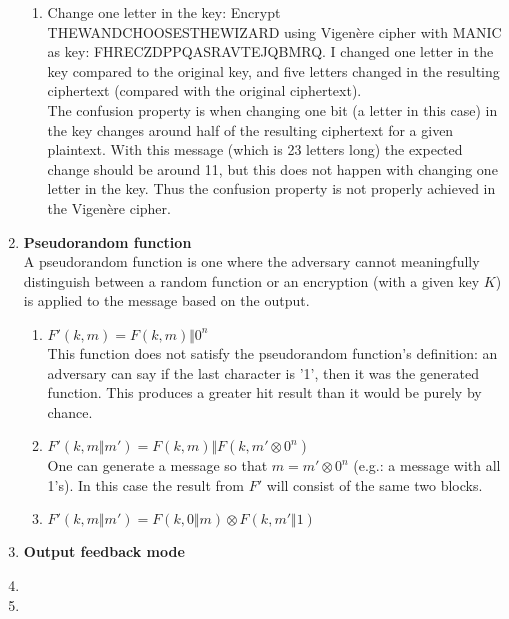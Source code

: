 \documentclass{article}
\begin{document}
\begin{enumerate}[label=\textbf{Task \arabic*:}]
\begin{enumerate}[label=\textit{Part \roman*:}]
			\item Change one letter in the key: Encrypt \textsc{THEWANDCHOOSESTHEWIZARD} using Vigenère cipher with \textsc{MANIC} as key: \textsc{FHRECZDPPQASRAVTEJQBMRQ}. I changed one letter in the key compared to the original key, and five letters changed in the resulting ciphertext (compared with the original ciphertext).\\
			The confusion property is when changing one bit (a letter in this case) in the key changes around half of the resulting ciphertext for a given plaintext. With this message (which is 23 letters long) the expected change should be around 11, but this does not happen with changing one letter in the key. Thus the confusion property is not properly achieved in the Vigenère cipher.	
		\end{enumerate}
		\item \textbf{Pseudorandom function} \\
		A pseudorandom function is one where the adversary cannot meaningfully distinguish between a random function or an encryption (with a given key $K$) is applied to the message based on the output.
		\begin{enumerate}[label=-]
			\item $ F'(k, m) = F(k, m) \Vert 0^n $ \\
			This function does not satisfy the pseudorandom function's definition: an adversary can say if the last character is '1', then it was the generated function. This produces a greater hit result than it would be purely by chance.
			\item $ F'(k, m \Vert m') = F(k, m) \Vert F(k, m' \otimes 0^n) $ \\
			One can generate a message so that $m = m' \otimes 0^n$ (e.g.: a message with all 1's). In this case the result from $F'$ will consist of the same two blocks.
			\item $ F'(k, m \Vert m') = F(k, 0 \Vert m) \otimes F(k, m' \Vert 1) $
		\end{enumerate}
		\item \textbf{Output feedback mode}
		\item 
		\item 
	\end{enumerate}
	
\end{document}
